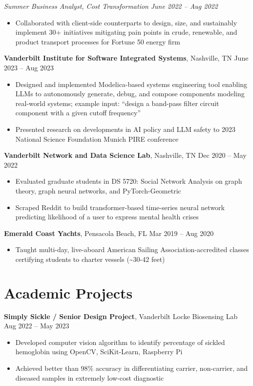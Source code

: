 \documentclass[10.5pt]{article}
\newcommand{\postlinebreakspacing} {
  \vspace{0.4ex}
}
\newcommand{\roleheader}[3]{
  \postlinebreakspacing
  \textbf{#1}, #2 \hfill #3
}
\newcommand{\itemizedrole}[5]{
  \roleheader{#1}{#2}{#3 -- #4}

  \begin{itemize}
    #5
  \end{itemize}
}
\newcommand{\subrole}[5]{
  \vspace{0.1ex}
  \textit{#1, #2} \hfill \textit{#3 -- #4}

  \begin{itemize}
    #5
  \end{itemize}
}
\begin{document}
{	\subrole
	{Summer Business Analyst}
	{Cost Transformation}
	{June 2022}
	{Aug 2022}
	{
		\item Collaborated with client-side counterparts to design, size, and sustainably implement 30+ initiatives mitigating pain points in crude, renewable, and product transport processes for Fortune 50 energy firm

	}
}

\itemizedrole
{Vanderbilt Institute for Software Integrated Systems}
{Nashville, TN}
{June 2023}
{Aug 2023}
{

	\item Designed and implemented Modelica-based systems engineering tool enabling LLMs to autonomously generate, debug, and compose components modeling real-world systems; example input: ``design a band-pass filter circuit component with a given cutoff frequency''
	\item Presented research on developments in AI policy and LLM safety to 2023 National Science Foundation Munich PIRE conference
}

\itemizedrole
{Vanderbilt Network and Data Science Lab}
{Nashville, TN}
{Dec 2020}
{May 2022}
{

	\item Evaluated graduate students in DS 5720: Social Network Analysis on graph theory, graph neural networks, and PyTorch-Geometric
	\item Scraped Reddit to build transformer-based time-series neural network predicting likelihood of a user to express mental health crises
}

\itemizedrole
{Emerald Coast Yachts}
{Pensacola Beach, FL}
{Mar 2019}
{Aug 2020}
{
	\item Taught multi-day, live-aboard American Sailing Association-accredited classes certifying students to charter vessels (\textasciitilde30-42 feet)
}


\section*{Academic Projects}
\itemizedrole
{Simply Sickle / Senior Design Project}
{Vanderbilt Locke Biosensing Lab}
{Aug 2022}
{May 2023}
{
	\item Developed computer vision algorithm to identify percentage of sickled hemoglobin using OpenCV, SciKit-Learn, Raspberry Pi
	\item Achieved better than 98\% accuracy in differentiating carrier, non-carrier, and diseased samples in extremely low-cost diagnostic
}
\end{document}

